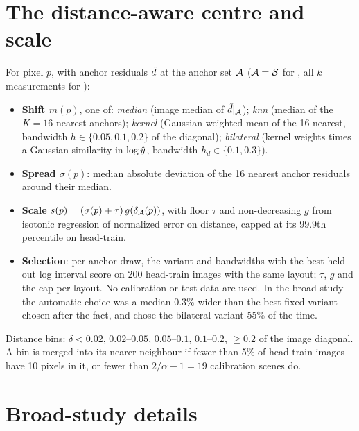 \section{The distance-aware centre and scale}
\label{app:adist}
For pixel $p$, with anchor residuals $\tilde{d}$ at the anchor set $\mathcal{A}$ ($\mathcal{A}=\mathcal{S}$ for \mDual, all $k$ measurements for \mDistSplit):
\begin{itemize}[leftmargin=*,itemsep=1pt,topsep=2pt]
\item \textbf{Shift $m(p)$}, one of: \emph{median} (image median of $\tilde{d}|_{\mathcal{A}}$); \emph{knn} (median of the $K=16$ nearest anchors); \emph{kernel} (Gaussian-weighted mean of the 16 nearest, bandwidth $h\in\{0.05,0.1,0.2\}$ of the diagonal); \emph{bilateral} (kernel weights times a Gaussian similarity in $\log\hat{y}$, bandwidth $h_d\in\{0.1,0.3\}$).
\item \textbf{Spread $\sigma(p)$}: median absolute deviation of the 16 nearest anchor residuals around their median.
\item \textbf{Scale} $s(p)=(\sigma(p)+\tau)\,g(\delta_{\mathcal{A}}(p))$, with floor $\tau$ and non-decreasing $g$ from isotonic regression of normalized error on distance, capped at its 99.9th percentile on head-train.
\item \textbf{Selection}: per anchor draw, the variant and bandwidths with the best held-out log interval score on 200 head-train images with the same layout; $\tau$, $g$ and the cap per layout. No calibration or test data are used.
In the broad study the automatic choice was a median 0.3\% wider than the best fixed variant chosen after the fact, and chose the bilateral variant 55\% of the time.
\end{itemize}
Distance bins: $\delta<0.02$, $0.02$--$0.05$, $0.05$--$0.1$, $0.1$--$0.2$, $\ge0.2$ of the image diagonal.
A bin is merged into its nearer neighbour if fewer than 5\% of head-train images have 10 pixels in it, or fewer than $2/\alpha-1=19$ calibration scenes do.

\section{Broad-study details}
\label{app:broad}

